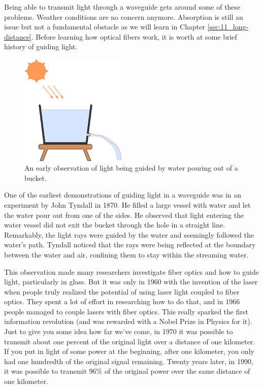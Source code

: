 Being able to transmit light through a waveguide gets around some of these problems.
Weather conditions are no concern anymore.
Absorption is still an issue but not a fundamental obstacle as we will learn in Chapter \ref{sec:11_long-distance}.
Before learning how optical fibers work, it is worth at some brief history of guiding light.

\begin{figure}[t]
    \centering
    \includegraphics[width=0.45\textwidth]{lesson7/7-1_tyndall.pdf}
    \caption[Tyndall's experiment]{An early observation of light being guided by water pouring out of a bucket.}
    \label{fig:7-1_tyndall}
\end{figure}

One of the earliest demonstrations of guiding light in a waveguide was in an experiment by John Tyndall in 1870.
He filled a large vessel with water and let the water pour out from one of the sides.
He observed that light entering the water vessel did not exit the bucket through the hole in a straight line.
Remarkably, the light rays were guided by the water and seemingly followed the water's path.
Tyndall noticed that the rays were being reflected at the boundary between the water and air, confining them to stay within the streaming water.

This observation made many researchers investigate fiber optics and how to guide light, particularly in glass.
But it was only in 1960 with the invention of the laser when people truly realized the potential of using laser light coupled to fiber optics.
They spent a lot of effort in researching how to do that, and in 1966 people managed to couple lasers with fiber optics.
This really sparked the first information revolution (and was rewarded with a Nobel Prize in Physics for it).
Just to give you some idea how far we've come, in 1970 it was possible to transmit about one percent of the original light over a distance of one kilometer.
If you put in light of some power at the beginning, after one kilometer, you only had one hundredth of the original signal remaining.
Twenty years later, in 1990, it was possible to transmit 96\% of the original power over the same distance of one kilometer.

